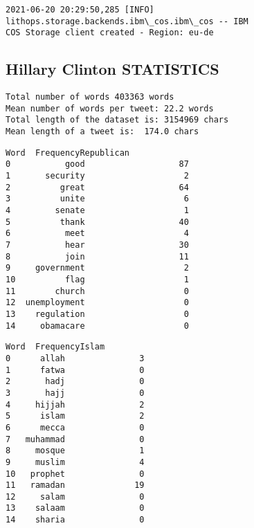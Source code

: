 \documentclass[11pt]{article}
\begin{document}
    \begin{Verbatim}[commandchars=\\\{\}]
2021-06-20 20:29:50,285 [INFO] lithops.storage.backends.ibm\_cos.ibm\_cos -- IBM
COS Storage client created - Region: eu-de
    \end{Verbatim}

    

    \hypertarget{hillary-clinton-statistics}{%
\subsection{Hillary Clinton
STATISTICS}\label{hillary-clinton-statistics}}

    \begin{Verbatim}[commandchars=\\\{\}]
Total number of words 403363 words
Mean number of words per tweet: 22.2 words
Total length of the dataset is: 3154969 chars
Mean length of a tweet is:  174.0 chars
    \end{Verbatim}

            \begin{tcolorbox}[breakable, size=fbox, boxrule=.5pt, pad at break*=1mm, opacityfill=0]
\begin{Verbatim}[commandchars=\\\{\}]
            Word  FrequencyRepublican
0           good                   87
1       security                    2
2          great                   64
3          unite                    6
4         senate                    1
5          thank                   40
6           meet                    4
7           hear                   30
8           join                   11
9     government                    2
10          flag                    1
11        church                    0
12  unemployment                    0
13    regulation                    0
14     obamacare                    0
\end{Verbatim}
\end{tcolorbox}
        
            \begin{tcolorbox}[breakable, size=fbox, boxrule=.5pt, pad at break*=1mm, opacityfill=0]
\begin{Verbatim}[commandchars=\\\{\}]
        Word  FrequencyIslam
0      allah               3
1      fatwa               0
2       hadj               0
3       hajj               0
4     hijjah               2
5      islam               2
6      mecca               0
7   muhammad               0
8     mosque               1
9     muslim               4
10   prophet               0
11   ramadan              19
12     salam               0
13    salaam               0
14    sharia               0
\end{Verbatim}
\end{tcolorbox}
        
\end{document}
